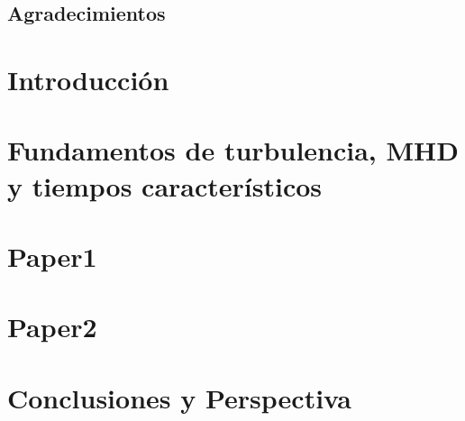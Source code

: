 \documentclass[12pt]{book}
\begin{document}
\newpage

\section*{Agradecimientos}



\tableofcontents
\mainmatter
\chapter[Introducción]{Introducción}
\label{ch:introduccion}



\chapter[Fundamentos de turbulencia, MHD y tiempos característicos]{Fundamentos de turbulencia,  MHD y tiempos característicos}
\label{ch:fundamentos}


\chapter[Paper1]{Paper1}
\label{ch:P1}


\chapter[Paper2]{Paper2}
\label{ch:P2}


\chapter[Conclusiones y Perspectiva]{Conclusiones y Perspectiva}
\label{ch:conclusiones}








\end{document}
